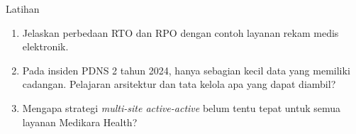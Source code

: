\documentclass[aspectratio=169, table, 12pt]{beamer}
\begin{document}
\begin{frame}{{\Large Latihan}}
  \vspace{6pt}
  \small
  \begin{enumerate}
    \item Jelaskan perbedaan RTO dan RPO dengan contoh layanan rekam medis elektronik.
    \item Pada insiden PDNS 2 tahun 2024, hanya sebagian kecil data yang memiliki cadangan.
          Pelajaran arsitektur dan tata kelola apa yang dapat diambil?
    \item Mengapa strategi \textit{multi-site active-active} belum tentu tepat untuk semua layanan
          Medikara Health?
  \end{enumerate}
\end{frame}
\end{document}
